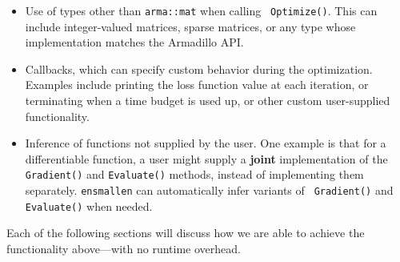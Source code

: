 \begin{itemize}
  \item Use of types other than {\tt \small arma::mat} when calling {\tt \small
Optimize()}.  This can include integer-valued matrices, sparse matrices, or any
type whose implementation matches the Armadillo API.

  \item Callbacks, which can specify custom behavior during the optimization.
Examples include printing the loss function value at each iteration, or
terminating when a time budget is used up, or other custom user-supplied
functionality.

  \item Inference of functions not supplied by the user.  One example is that
for a differentiable function, a user might supply a {\bf joint} implementation
of the {\tt Gradient()} and {\tt Evaluate()} methods, instead of implementing
them separately.  {\tt ensmallen} can automatically infer variants of {\tt
Gradient()} and {\tt Evaluate()} when needed.
\end{itemize}

Each of the following sections will discuss how we are able to achieve the
functionality above---with no runtime overhead.
